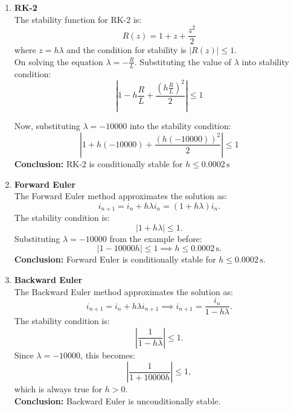 \begin{enumerate}
    \item \textbf{RK-2}\\
    The stability function for RK-2 is:
    \begin{equation}
        R(z)=1+z+ \frac{z^2}{2}
    \end{equation}
    where $z=h \lambda$ and the condition for stability is $|R(z)| \leq 1$.\\
    On solving the equation $\lambda =-\frac{R}{L}$.
    Substituting the value of $\lambda$ into stability condition:
    \begin{equation}
        |1-h \frac{R}{L}+\frac{(h \frac{R}{L})^2}{2}| \leq 1
    \end{equation}
    
    Now, substituting $\lambda=-10000$ into the stability condition:
    \begin{equation}
        |1+h(-10000)+\frac{(h(-10000))^2}{2}| \leq 1
    \end{equation}
    \textbf{Conclusion:} RK-2 is conditionally stable for \( h \leq 0.0002 \, \text{s} \)

    
    \item \textbf{Forward Euler}\\
    The Forward Euler method approximates the solution as:
    \begin{equation}
        i_{n+1} = i_n + h \lambda i_n = (1 + h \lambda) i_n.
    \end{equation}
    The stability condition is:
    \begin{equation}
        |1 + h \lambda| \leq 1.
    \end{equation}
    Substituting \( \lambda = -10000 \) from the example before:
    \begin{equation}
        |1 - 10000 h| \leq 1 \implies h \leq 0.0002 \, \text{s}.
    \end{equation}
    \textbf{Conclusion:} Forward Euler is conditionally stable for \( h \leq 0.0002 \, \text{s} \).
    

    \item \textbf{Backward Euler}\\
    The Backward Euler method approximates the solution as:
    \begin{equation}
        i_{n+1} = i_n + h \lambda i_{n+1} \implies i_{n+1} = \frac{i_n}{1 - h \lambda}.
    \end{equation}
    The stability condition is:
    \begin{equation}
        \left| \frac{1}{1 - h \lambda} \right| \leq 1.
    \end{equation}
    Since \( \lambda = -10000 \), this becomes:
    \begin{equation}
        \left| \frac{1}{1 + 10000 h} \right| \leq 1,
    \end{equation}
    which is always true for \( h > 0 \).\\
    \textbf{Conclusion:} Backward Euler is unconditionally stable.



\end{enumerate}
